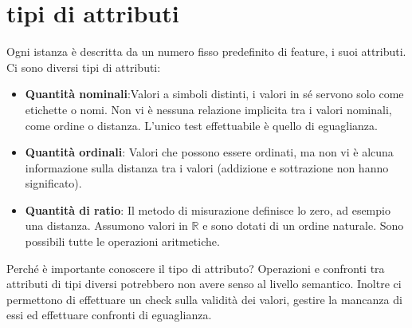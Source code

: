 \section{tipi di attributi}
Ogni istanza è descritta da un numero fisso predefinito di feature, i suoi attributi.
Ci sono diversi tipi di attributi:
\begin{itemize}
	\item \textbf{Quantità nominali}:Valori a simboli distinti, i valori in sé servono solo come etichette o nomi.
		Non vi è nessuna relazione implicita tra i valori nominali, come ordine o distanza. L'unico test effettuabile è quello di eguaglianza.
	\item \textbf{Quantità ordinali}: Valori che possono essere ordinati, ma non vi è alcuna informazione sulla distanza tra i valori (addizione e sottrazione non hanno significato).
	\item \textbf{Quantità di ratio}: Il metodo di misurazione definisce lo zero, ad esempio una distanza. Assumono valori in $\mathbb{R}$ e sono dotati di un ordine naturale. Sono possibili tutte le operazioni aritmetiche.
\end{itemize}
Perché è importante conoscere il tipo di attributo? Operazioni e confronti tra attributi di tipi diversi potrebbero non avere senso al livello semantico. Inoltre ci permettono di effettuare un check sulla validità dei valori, gestire la mancanza di essi ed effettuare confronti di eguaglianza.
